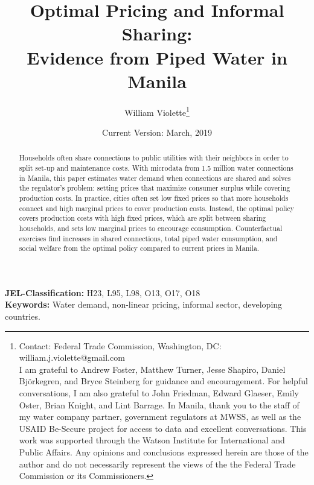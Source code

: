 \documentclass[12pt]{article}
\title{ Optimal Pricing and Informal Sharing: \\ Evidence from Piped Water in Manila }
\author{William Violette\thanks{Contact: Federal Trade Commission, Washington, DC: william.j.violette@gmail.com \\ I am grateful to Andrew Foster, Matthew Turner, Jesse Shapiro, Daniel Bj\"{o}rkegren, and Bryce Steinberg for guidance and encouragement.  For helpful conversations, I am also grateful to John Friedman, Edward Glaeser, Emily Oster, Brian Knight, and Lint Barrage.  In Manila, thank you to the staff of my water company partner, government regulators at MWSS, as well as the USAID Be-Secure project for access to data and excellent conversations.  This work was supported through the Watson Institute for International and Public Affairs.  Any opinions and conclusions expressed herein are those of the author and do not necessarily represent the views of the the Federal Trade Commission or its Commissioners.}
 }
\date{Current Version: March, 2019}
\begin{document}
\maketitle
\begin{abstract}




	Households often share connections to public utilities with their neighbors in order to split set-up and maintenance costs.  With microdata from 1.5 million water connections in Manila, this paper estimates water demand when connections are shared and solves the regulator's problem: setting prices that maximize consumer surplus while covering production costs.  In practice, cities often set low fixed prices so that more households connect and high marginal prices to cover production costs.  Instead, the optimal policy covers production costs with high fixed prices, which are split between sharing households, and sets low marginal prices to encourage consumption.  Counterfactual exercises find increases in shared connections, total piped water consumption, and social welfare from the optimal policy compared to current prices in Manila.







\end{abstract} 
\vspace{1cm}
{\bf JEL-Classification:} H23, L95, L98, O13, O17, O18 \\
\vspace{.1cm}
{\bf Keywords:} Water demand, non-linear pricing, informal sector, developing countries. 
\end{document}
